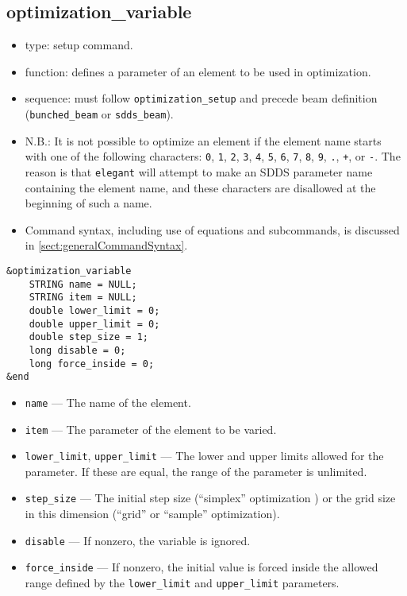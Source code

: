 \documentclass[11pt]{article}
\begin{document}
\subsection{optimization\_variable \label{subsec:optimizationvariable}}

\begin{itemize}
\item type: setup command.
\item function: defines a parameter of an element to be used in optimization.
\item sequence: must follow \verb|optimization_setup| and precede beam definition (\verb|bunched_beam| or \verb|sdds_beam|).
\item N.B.: It is not possible to optimize an element if the element name starts with one of the following
characters: 
\verb|0|, \verb|1|, \verb|2|, \verb|3|, \verb|4|, \verb|5|, \verb|6|, \verb|7|, \verb|8|,
\verb|9|, \verb|.|, \verb|+|, or \verb|-|.  The reason is that {\tt elegant} will attempt to 
make an SDDS parameter name containing the element name, and these characters are disallowed
at the beginning of such a name.
\item Command syntax, including use of equations and subcommands, is discussed in \ref{sect:generalCommandSyntax}.
\end{itemize}

\begin{verbatim}
&optimization_variable
    STRING name = NULL;
    STRING item = NULL;
    double lower_limit = 0;
    double upper_limit = 0;
    double step_size = 1;
    long disable = 0;
    long force_inside = 0;
&end
\end{verbatim}

\begin{itemize}
\item \verb|name| --- The name of the element.
\item \verb|item| --- The parameter of the element to be varied.
\item \verb|lower_limit|, \verb|upper_limit| --- The lower and upper limits allowed for the parameter.  If these are
equal, the range of the parameter is unlimited.
\item \verb|step_size| --- The initial step size (``simplex'' optimization ) or the grid size in this dimension (``grid'' or ``sample'' optimization).
\item \verb|disable| --- If nonzero, the variable is ignored.
\item \verb|force_inside| --- If nonzero, the initial value is forced inside the allowed range defined by the \verb|lower_limit| and \verb|upper_limit| parameters.
\end{itemize}
\end{document}

